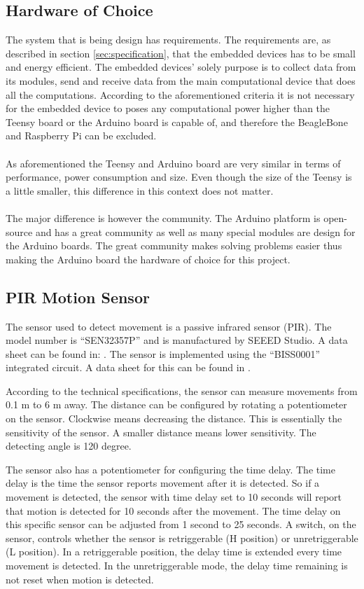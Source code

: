 \subsection{Hardware of Choice}
The system that is being design has requirements. The requirements are, as described in section \ref{sec:specification}, that the embedded devices has to be small and energy efficient. The embedded devices' solely purpose is to collect data from its modules, send and receive data from the main computational device that does all the computations. According to the aforementioned criteria it is not necessary for the embedded device to poses any computational power higher than the Teensy board or the Arduino board is capable of, and therefore the BeagleBone and Raspberry Pi can be excluded. 
\\\\
As aforementioned the Teensy and Arduino board are very similar in terms of performance, power consumption and size. Even though the size of the Teensy is a little smaller, this difference in this context does not matter.
\\\\
The major difference is however the community. The Arduino platform is open-source and has a great community as well as many special modules are design for the Arduino boards. The great community makes solving problems easier thus making the Arduino board the hardware of choice for this project.

\subsection{PIR Motion Sensor}

The sensor used to detect movement is a passive infrared sensor (PIR). The model
number is \enquote{SEN32357P} and is manufactured by SEEED Studio. A data sheet
can be found in:
\cite{datasheet_pir1}. The
sensor is implemented using the \enquote{BISS0001} integrated circuit. A data sheet for this can
be found in \cite{datasheet_pir2}.

According to the technical specifications, the sensor can measure movements from 0.1 m to 6 m away. The distance can be configured by rotating a potentiometer on the sensor. Clockwise means decreasing the distance. This is essentially the sensitivity of the sensor. A smaller distance means lower sensitivity. The detecting angle is 120 degree.

The sensor also has a potentiometer for configuring the time delay. The time
delay is the time the sensor reports movement after it is detected. So
if a movement is detected, the sensor with time delay set to 10 seconds will report that motion is detected for 10 seconds after the movement.
The time delay on this specific sensor can be adjusted from 1 second to 25 seconds. A switch, on the sensor, controls whether the sensor is retriggerable (H position) or unretriggerable (L position). In a retriggerable position, the delay time is extended every time movement is detected. In the unretriggerable mode, the delay time remaining is not reset when motion is detected.

